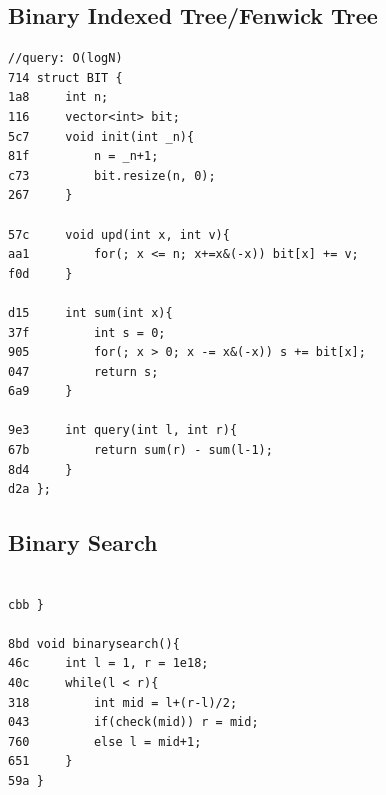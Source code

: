 \documentclass[11pt, a4paper, twoside]{article}
\begin{document}
\subsection{Binary Indexed Tree/Fenwick Tree}
\begin{lstlisting}
//query: O(logN)
714 struct BIT {
1a8     int n;
116     vector<int> bit;
5c7     void init(int _n){
81f         n = _n+1;
c73         bit.resize(n, 0);
267     }
    
57c     void upd(int x, int v){
aa1         for(; x <= n; x+=x&(-x)) bit[x] += v;
f0d     }
    
d15     int sum(int x){
37f         int s = 0;
905         for(; x > 0; x -= x&(-x)) s += bit[x];
047         return s;
6a9     }
    
9e3     int query(int l, int r){
67b         return sum(r) - sum(l-1);
8d4     }
d2a };
\end{lstlisting}

\subsection{Binary Search}
\begin{lstlisting}

cbb }
     
8bd void binarysearch(){
46c     int l = 1, r = 1e18;
40c     while(l < r){
318         int mid = l+(r-l)/2;
043         if(check(mid)) r = mid;
760         else l = mid+1;
651     }  
59a }
\end{lstlisting}
\end{document}
